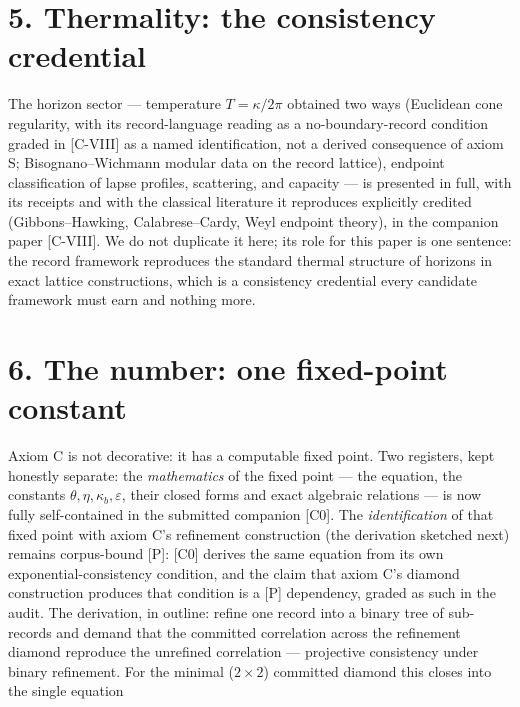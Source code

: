 \documentclass[11pt]{article}
\begin{document}
\section*{5. Thermality: the consistency credential}
The horizon sector — temperature $T = \kappa/2\pi$ obtained two ways (Euclidean cone regularity, with its record-language reading as a no-boundary-record condition graded in [C-VIII] as a named identification, not a derived consequence of axiom S; Bisognano–Wichmann modular data on the record lattice), endpoint classification of lapse profiles, scattering, and capacity — is presented in full, with its receipts and with the classical literature it reproduces explicitly credited (Gibbons–Hawking, Calabrese–Cardy, Weyl endpoint theory), in the companion paper [C-VIII].  We do not duplicate it here; its role for this paper is one sentence: the record framework reproduces the standard thermal structure of horizons in exact lattice constructions, which is a consistency credential every candidate framework must earn and nothing more.

\section*{6. The number: one fixed-point constant}
Axiom C is not decorative: it has a computable fixed point.  Two registers, kept honestly separate: the \emph{mathematics} of the fixed point — the equation, the constants $\theta, \eta, \kappa_b, \varepsilon$, their closed forms and exact algebraic relations — is now fully self-contained in the submitted companion [C0].  The \emph{identification} of that fixed point with axiom C's refinement construction (the derivation sketched next) remains corpus-bound [P]: [C0] derives the same equation from its own exponential-consistency condition, and the claim that axiom C's diamond construction produces that condition is a [P] dependency, graded as such in the audit.  The derivation, in outline: refine one record into a binary tree of sub-records and demand that the committed correlation across the refinement diamond reproduce the unrefined correlation — projective consistency under binary refinement.  For the minimal ($2\times 2$) committed diamond this closes into the single equation
\end{document}
